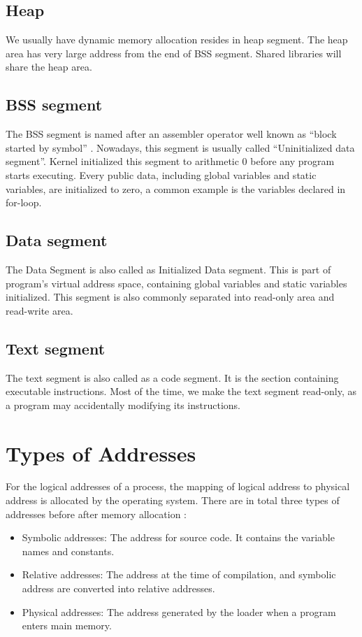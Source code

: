 \documentclass[doc,natbib,12pt]{apa6}
\begin{document}
	\subsection{Heap}
	We usually have dynamic memory allocation resides in heap segment. The heap area has very large address from the end of BSS segment. Shared libraries will share the heap area.
	
	\subsection{BSS segment} 
	The BSS segment is named after an assembler operator well known as ``block started by symbol'' \citep{Stevens1992}. Nowadays, this segment is usually called ``Uninitialized data segment''. Kernel initialized this segment to arithmetic 0 before any program starts executing. Every public data, including global variables and static variables, are initialized to zero, a common example is the variables declared in for-loop.
	
	\subsection{Data segment}
	The Data Segment is also called as Initialized Data segment. This is part of program's virtual address space, containing global variables and static variables initialized. This segment is also commonly separated into read-only area and read-write area.
	
	\subsection{Text segment}
	The text segment is also called as a code segment. It is the section containing executable instructions. Most of the time, we make the text segment read-only, as a program may accidentally modifying its instructions.
	
	\newpage
	\section{Types of Addresses} \label{chp:typesAddresses}
	For the logical addresses of a process, the mapping of logical address to physical address is allocated by the operating system. There are in total three types of addresses before after memory allocation \citep{Silberschatz2001}:
	
	\begin{itemize}
		\item Symbolic addresses: The address for source code. It contains the variable names and constants.
		\item Relative addresses: The address at the time of compilation, and symbolic address are converted into relative addresses.
		\item Physical addresses: The address generated by the loader when a program enters main memory.
	\end{itemize}
	
\end{document}
